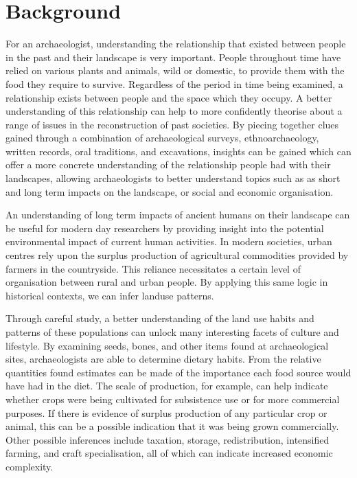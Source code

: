 \section{Background} 

  For an archaeologist, understanding the relationship that existed between
  people in the past and their landscape is very important.  People throughout
  time have relied on various plants and animals, wild or domestic, to provide
  them with the food they require to survive.  Regardless of the period in time
  being examined, a relationship exists between people and the space which they
  occupy.  A better understanding of this relationship can help to more
  confidently theorise about a range of issues in the reconstruction of past
  societies.  By piecing together clues gained through a combination of
  archaeological surveys, ethnoarchaeology, written records, oral traditions,
  and excavations, insights can be gained which can offer a more concrete
  understanding of the relationship people had with their landscapes, allowing
  archaeologists to better understand topics such as as short and long term
  impacts on the landscape, or social and economic organisation. 
  
  An understanding of long term impacts of ancient humans on their landscape
  can be useful for modern day researchers by providing insight into the potential 
  environmental impact of current human activities. In modern societies, urban 
  centres rely upon the surplus production of agricultural commodities provided 
  by farmers in the countryside.  This reliance necessitates a certain level of 
  organisation between rural and urban people.  By applying this same logic in 
  historical contexts, we can infer landuse patterns.
  
  Through careful study, a better understanding of the land use habits and
  patterns of these populations can unlock many interesting facets of culture
  and lifestyle.  By examining seeds, bones, and other items found at archaeological
  sites, archaeologists are able to determine dietary habits. From the relative
  quantities found estimates can be made of the importance each food source
  would have had in the diet.  The scale of production, for example, can help
  indicate whether crops were being cultivated for subsistence use or for more
  commercial purposes.  If there is evidence of surplus production of any particular crop
  or animal, this can be a possible indication that it was being grown
  commercially.  Other possible inferences include taxation, storage, redistribution,
  intensified farming, and craft specialisation, all of which can indicate 
  increased economic complexity.


